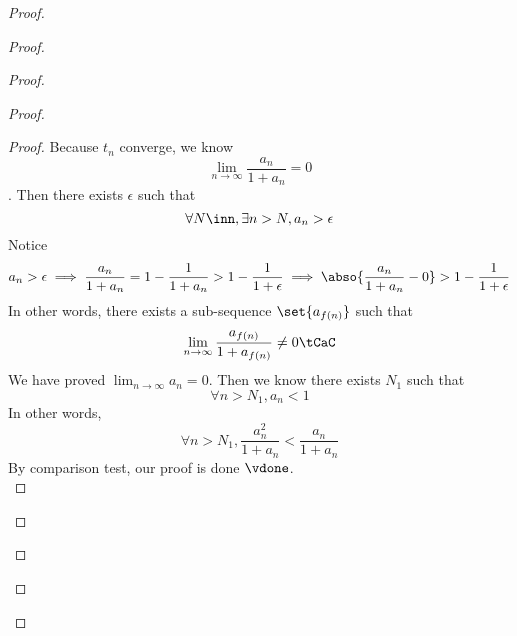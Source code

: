 \documentclass{report}
\begin{document}
\begin{proof}
\begin{proof}
\begin{proof}
\begin{proof}
\begin{proof}
Because $t_n$ converge, we know 
 \begin{equation*}
\lim_{n\to\infty}\frac{a_n}{1+a_n}=0
\end{equation*}
. Then there exists $\epsilon $ such that
\begin{equation*}
\forall N\inn, \exists n>N, a_n>\epsilon 
\end{equation*}
Notice
\begin{equation*}
a_n>\epsilon \implies \frac{a_n}{1+a_n}=1-\frac{1}{1+a_n}>1-\frac{1}{1+\epsilon }\implies \abso{\frac{a_n}{1+a_n}-0}>1-\frac{1}{1+\epsilon }
\end{equation*}
In other words, there exists a sub-sequence $\set{a_{f(n)}}$ such that
\begin{equation*}
\lim_{n\to\infty}\frac{a_{f(n)}}{1+a_{f(n)}}\neq 0\tCaC
\end{equation*}
We have proved $\lim_{n\to\infty}a_n=0$. Then we know there exists $N_1$ such that
 \begin{equation*}
\forall n>N_1, a_n<1
\end{equation*}
In other words,
\begin{equation*}
\forall n>N_1, \frac{a_n^2}{1+a_n}<\frac{a_n}{1+a_n}
\end{equation*}
By comparison test, our proof is done $\vdone$.\\


\end{proof}
\end{proof}
\end{proof}
\end{proof}
\end{proof}
\end{document}
